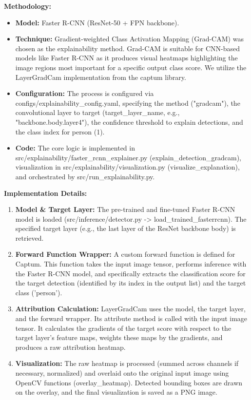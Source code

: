 \textbf{Methodology:}
\begin{itemize}
    \item   \textbf{Model:} Faster R-CNN (ResNet-50 + FPN backbone).
    \item   \textbf{Technique:} Gradient-weighted Class Activation Mapping (Grad-CAM) was chosen as the explainability method. Grad-CAM is suitable for CNN-based models like Faster R-CNN as it produces visual heatmaps highlighting the image regions most important for a specific output class score. We utilize the {LayerGradCam} implementation from the {captum} library.
    \item   \textbf{Configuration:} The process is configured via configs/explainability\_config.yaml, specifying the method ("gradcam"), the convolutional layer to target ({target\_layer\_name}, e.g., "backbone.body.layer4"), the confidence threshold to explain detections, and the class index for person (1).
    \item   \textbf{Code:} The core logic is implemented in {src/explainability/faster\_rcnn\_explainer.py} ({explain\_detection\_gradcam}), visualization in {src/explainability/visualization.py} ({visualize\_explanation}), and orchestrated by {src/run\_explainability.py}.
\end{itemize}

\textbf{Implementation Details:}
\begin{enumerate}
    \item  \textbf{Model \& Target Layer:} The pre-trained and fine-tuned Faster R-CNN model is loaded ({src/inference/detector.py -> load\_trained\_fasterrcnn}). The specified target layer (e.g., the last layer of the ResNet backbone body) is retrieved.
    \item  \textbf{Forward Function Wrapper:} A custom forward function is defined for Captum. This function takes the input image tensor, performs inference with the Faster R-CNN model, and specifically extracts the classification score for the target detection (identified by its index in the output list) and the target class ('person').
    \item  \textbf{Attribution Calculation:} {LayerGradCam} uses the model, the target layer, and the forward wrapper. Its {attribute} method is called with the input image tensor. It calculates the gradients of the target score with respect to the target layer's feature maps, weights these maps by the gradients, and produces a raw attribution heatmap.
    \item  \textbf{Visualization:} The raw heatmap is processed (summed across channels if necessary, normalized) and overlaid onto the original input image using OpenCV functions ({overlay\_heatmap}). Detected bounding boxes are drawn on the overlay, and the final visualization is saved as a PNG image.
\end{enumerate}

